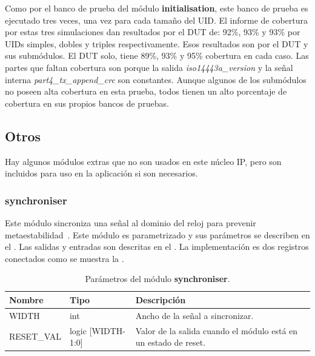 \documentclass[a4paper, twoside, 11pt]{report}
\begin{document}
Como por el banco de prueba del módulo \textbf{initialisation}, este banco de prueba es ejecutado tres veces, una vez para cada tamaño del UID. El informe de cobertura por estas tres simulaciones dan resultados por el DUT de: 92\%, 93\% y 93\% por UIDs simples, dobles y triples respectivamente. Esos resultados son por el DUT y sus submódulos. El DUT solo, tiene 89\%, 93\% y 95\% cobertura en cada caso. Las partes que faltan cobertura son porque la salida \textit{iso14443a\_version} y la señal interna \textit{part4\_tx\_append\_crc} son constantes. Aunque algunos de los submódulos no poseen alta cobertura en esta prueba, todos tienen un alto porcentaje de cobertura en sus propios bancos de pruebas.

\FloatBarrier
\subsection{Otros}

Hay algunos módulos extras que no son usados en este núcleo IP, pero son incluidos para uso en la aplicación si son necesarios.

\FloatBarrier
\subsubsection{synchroniser}

Este módulo sincroniza una señal al dominio del reloj para prevenir metaestabilidad~\cite{synch_arb_in_digital_systems}. Este módulo es parametrizado y sus parámetros se describen en el . Las salidas y entradas son descritas en el . La implementación es dos registros conectados como se muestra la .

\begin{table}[htb]
  \centering
  \tablezebra
  \begin{tabulary}{\linewidth}{l|l|L}
    \textbf{Nombre}&\textbf{Tipo}&\textbf{Descripción} \\
    \hline
    WIDTH&int&Ancho de la señal a sincronizar. \\
    RESET\_VAL&logic [WIDTH-1:0]&Valor de la salida cuando el módulo está en un estado de reset. \\
  \end{tabulary}
  \caption{Parámetros del módulo \textbf{synchroniser}.}
  \label{tab:params_synchroniser}
\end{table}
\end{document}
